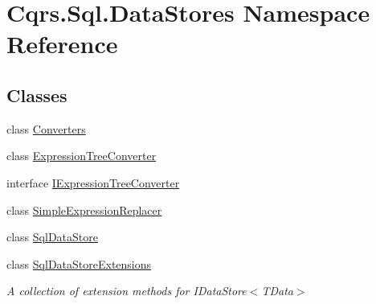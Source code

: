 \hypertarget{namespaceCqrs_1_1Sql_1_1DataStores}{}\section{Cqrs.\+Sql.\+Data\+Stores Namespace Reference}
\label{namespaceCqrs_1_1Sql_1_1DataStores}
\subsection*{Classes}
\begin{DoxyCompactItemize}
\item 
class \hyperlink{classCqrs_1_1Sql_1_1DataStores_1_1Converters}{Converters}
\item 
class \hyperlink{classCqrs_1_1Sql_1_1DataStores_1_1ExpressionTreeConverter}{Expression\+Tree\+Converter}
\item 
interface \hyperlink{interfaceCqrs_1_1Sql_1_1DataStores_1_1IExpressionTreeConverter}{I\+Expression\+Tree\+Converter}
\item 
class \hyperlink{classCqrs_1_1Sql_1_1DataStores_1_1SimpleExpressionReplacer}{Simple\+Expression\+Replacer}
\item 
class \hyperlink{classCqrs_1_1Sql_1_1DataStores_1_1SqlDataStore}{Sql\+Data\+Store}
\item 
class \hyperlink{classCqrs_1_1Sql_1_1DataStores_1_1SqlDataStoreExtensions}{Sql\+Data\+Store\+Extensions}
\begin{DoxyCompactList}\small\item\em A collection of extension methods for I\+Data\+Store$<$\+T\+Data$>$ \end{DoxyCompactList}\end{DoxyCompactItemize}
